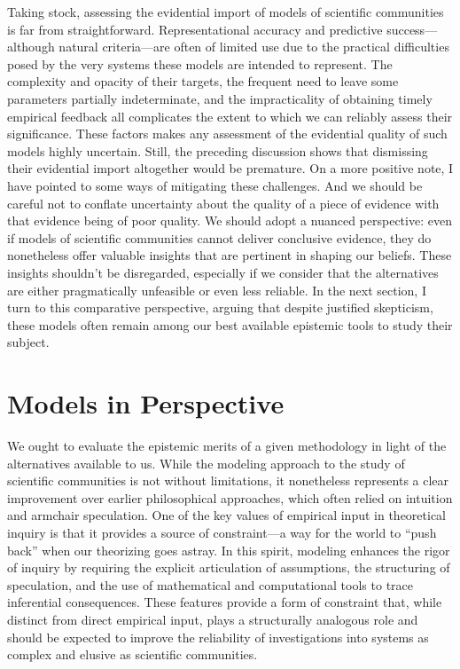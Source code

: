 \documentclass{article}
\begin{document}
Taking stock, assessing the evidential import of models of scientific communities is far from straightforward. Representational accuracy and predictive success—although natural criteria—are often of limited use due to the practical difficulties posed by the very systems these models are intended to represent. The complexity and opacity of their targets, the frequent need to leave some parameters partially indeterminate, and the impracticality of obtaining timely empirical feedback all complicates the extent to which we can reliably assess their significance. These factors makes any assessment of the evidential quality of such models highly uncertain. Still, the preceding discussion shows that dismissing their evidential import altogether would be premature. On a more positive note, I have pointed to some ways of mitigating these challenges. And we should be careful not to conflate uncertainty about the quality of a piece of evidence with that evidence being of poor quality. We should adopt a nuanced perspective: even if models of scientific communities cannot deliver conclusive evidence, they do nonetheless offer valuable insights that are pertinent in shaping our beliefs. These insights shouldn't be disregarded, especially if we consider that the alternatives are either pragmatically unfeasible or even less reliable. In the next section, I turn to this comparative perspective, arguing that despite justified skepticism, these models often remain among our best available epistemic tools to study their subject.


\section{Models in Perspective}

We ought to evaluate the epistemic merits of a given methodology in light of the alternatives available to us. While the modeling approach to the study of scientific communities is not without limitations, it nonetheless represents a clear improvement over earlier philosophical approaches, which often relied on intuition and armchair speculation. One of the key values of empirical input in theoretical inquiry is that it provides a source of constraint—a way for the world to “push back” when our theorizing goes astray. In this spirit, modeling enhances the rigor of inquiry by requiring the explicit articulation of assumptions, the structuring of speculation, and the use of mathematical and computational tools to trace inferential consequences. These features provide a form of constraint that, while distinct from direct empirical input, plays a structurally analogous role and should be expected to improve the reliability of investigations into systems as complex and elusive as scientific communities.
\end{document}
